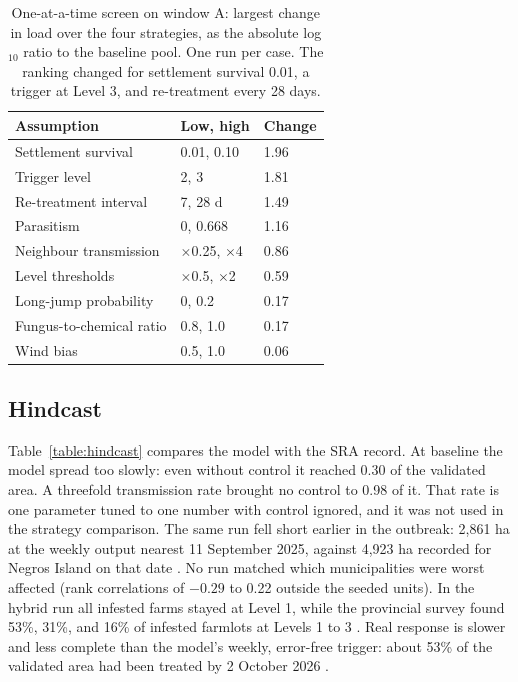 \begin{table}[!htbp]
\vspace{2ex}
\centering
\small
\caption{One-at-a-time screen on window A: largest change in load over the four strategies, as the absolute log$_{10}$ ratio to the baseline pool. One run per case. The ranking changed for settlement survival 0.01, a trigger at Level 3, and re-treatment every 28 days.}
\label{table:oat}
\begin{tabular}{lll}
\hline\hline
Assumption & Low, high & Change \\ \hline
Settlement survival & 0.01, 0.10 & 1.96 \\
Trigger level & 2, 3 & 1.81 \\
Re-treatment interval & 7, 28 d & 1.49 \\
Parasitism & 0, 0.668 & 1.16 \\
Neighbour transmission & $\times$0.25, $\times$4 & 0.86 \\
Level thresholds & $\times$0.5, $\times$2 & 0.59 \\
Long-jump probability & 0, 0.2 & 0.17 \\
Fungus-to-chemical ratio & 0.8, 1.0 & 0.17 \\
Wind bias & 0.5, 1.0 & 0.06 \\
\hline\hline
\end{tabular}
\end{table}

\subsection{Hindcast}

Table~\ref{table:hindcast} compares the model with the SRA record. At baseline the model spread too slowly: even without control it reached 0.30 of the validated area. A threefold transmission rate brought no control to 0.98 of it. That rate is one parameter tuned to one number with control ignored, and it was not used in the strategy comparison. The same run fell short earlier in the outbreak: 2,861 ha at the weekly output nearest 11 September 2025, against 4,923 ha recorded for Negros Island on that date \citep{MojicaSevilla2025}. No run matched which municipalities were worst affected (rank correlations of $-0.29$ to 0.22 outside the seeded units). In the hybrid run all infested farms stayed at Level 1, while the provincial survey found 53\%, 31\%, and 16\% of infested farmlots at Levels 1 to 3 \citep{PGNO2026}. Real response is slower and less complete than the model's weekly, error-free trigger: about 53\% of the validated area had been treated by 2 October 2026 \citep{SRA2026FOI}.

